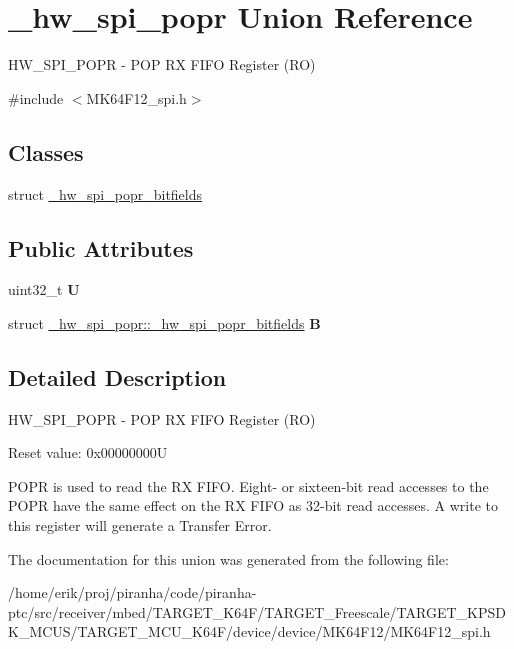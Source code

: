\hypertarget{union__hw__spi__popr}{}\section{\+\_\+hw\+\_\+spi\+\_\+popr Union Reference}
\label{union__hw__spi__popr}


H\+W\+\_\+\+S\+P\+I\+\_\+\+P\+O\+PR -\/ P\+OP RX F\+I\+FO Register (RO)  




{\ttfamily \#include $<$M\+K64\+F12\+\_\+spi.\+h$>$}

\subsection*{Classes}
\begin{DoxyCompactItemize}
\item 
struct \hyperlink{struct__hw__spi__popr_1_1__hw__spi__popr__bitfields}{\+\_\+hw\+\_\+spi\+\_\+popr\+\_\+bitfields}
\end{DoxyCompactItemize}
\subsection*{Public Attributes}
\begin{DoxyCompactItemize}
\item 
uint32\+\_\+t {\bfseries U}\hypertarget{union__hw__spi__popr_a7109268083fb0410a5a937d96b6ce95b}{}\label{union__hw__spi__popr_a7109268083fb0410a5a937d96b6ce95b}

\item 
struct \hyperlink{struct__hw__spi__popr_1_1__hw__spi__popr__bitfields}{\+\_\+hw\+\_\+spi\+\_\+popr\+::\+\_\+hw\+\_\+spi\+\_\+popr\+\_\+bitfields} {\bfseries B}\hypertarget{union__hw__spi__popr_adfc4e4a56e567463ffe31ce80e1068de}{}\label{union__hw__spi__popr_adfc4e4a56e567463ffe31ce80e1068de}

\end{DoxyCompactItemize}


\subsection{Detailed Description}
H\+W\+\_\+\+S\+P\+I\+\_\+\+P\+O\+PR -\/ P\+OP RX F\+I\+FO Register (RO) 

Reset value\+: 0x00000000U

P\+O\+PR is used to read the RX F\+I\+FO. Eight-\/ or sixteen-\/bit read accesses to the P\+O\+PR have the same effect on the RX F\+I\+FO as 32-\/bit read accesses. A write to this register will generate a Transfer Error. 

The documentation for this union was generated from the following file\+:\begin{DoxyCompactItemize}
\item 
/home/erik/proj/piranha/code/piranha-\/ptc/src/receiver/mbed/\+T\+A\+R\+G\+E\+T\+\_\+\+K64\+F/\+T\+A\+R\+G\+E\+T\+\_\+\+Freescale/\+T\+A\+R\+G\+E\+T\+\_\+\+K\+P\+S\+D\+K\+\_\+\+M\+C\+U\+S/\+T\+A\+R\+G\+E\+T\+\_\+\+M\+C\+U\+\_\+\+K64\+F/device/device/\+M\+K64\+F12/M\+K64\+F12\+\_\+spi.\+h\end{DoxyCompactItemize}
